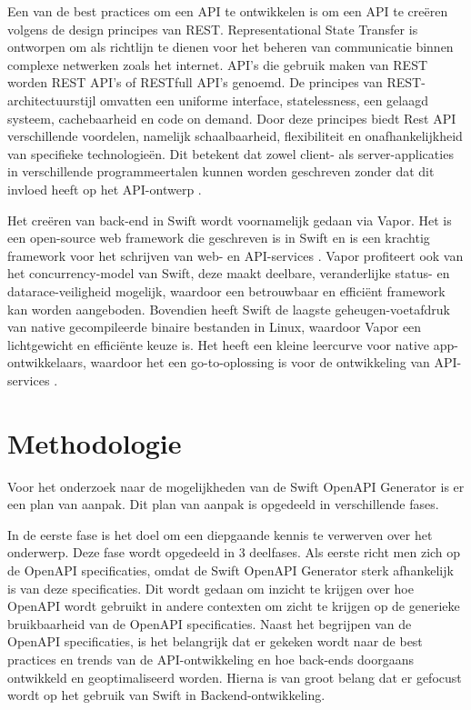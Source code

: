 Een van de best practices om een API te ontwikkelen is om een API te creëren volgens de design principes van REST. Representational State Transfer is ontworpen om als richtlijn te dienen voor het beheren van communicatie binnen complexe netwerken zoals het internet. API’s die gebruik maken van REST worden REST API’s of RESTfull API’s genoemd. De principes van REST-architectuurstijl omvatten een uniforme interface, statelessness, een gelaagd systeem, cachebaarheid en code on demand. Door deze principes biedt Rest API verschillende voordelen, namelijk schaalbaarheid, flexibiliteit en onafhankelijkheid van specifieke technologieën. Dit betekent dat zowel client- als server-applicaties in verschillende programmeertalen kunnen worden geschreven zonder dat dit invloed heeft op het API-ontwerp \autocite{2020}. 

Het creëren van back-end in Swift wordt voornamelijk gedaan via Vapor. Het is een open-source web framework die geschreven is in Swift en is een krachtig framework voor het schrijven van web- en API-services \autocite{Nelson}. Vapor profiteert ook van het concurrency-model van Swift, deze maakt deelbare, veranderlijke status- en datarace-veiligheid mogelijk, waardoor een betrouwbaar en efficiënt framework kan worden aangeboden. Bovendien heeft Swift de laagste geheugen-voetafdruk van native gecompileerde binaire bestanden in Linux, waardoor Vapor een lichtgewicht en efficiënte keuze is. Het heeft een kleine leercurve voor native app-ontwikkelaars, waardoor het een go-to-oplossing is voor de ontwikkeling van API-services \autocite{Pant2023}.



\section{Methodologie}%
\label{sec:methodologie}

Voor het onderzoek naar de mogelijkheden van de Swift OpenAPI Generator is er een plan van aanpak. Dit plan van aanpak is opgedeeld in verschillende fases. 

In de eerste fase is het doel om een diepgaande kennis te verwerven over het onderwerp. Deze fase wordt opgedeeld in 3 deelfases. Als eerste richt men zich op de OpenAPI specificaties, omdat de Swift OpenAPI Generator sterk afhankelijk is van deze specificaties. Dit wordt gedaan om inzicht te krijgen over hoe OpenAPI wordt gebruikt in andere contexten om zicht te krijgen op de generieke bruikbaarheid van de OpenAPI specificaties. Naast het begrijpen van de OpenAPI specificaties, is het belangrijk dat er gekeken wordt naar de best practices en trends van de API-ontwikkeling en hoe back-ends doorgaans ontwikkeld en geoptimaliseerd worden. Hierna is van groot belang dat er gefocust wordt op het gebruik van Swift in Backend-ontwikkeling. 

